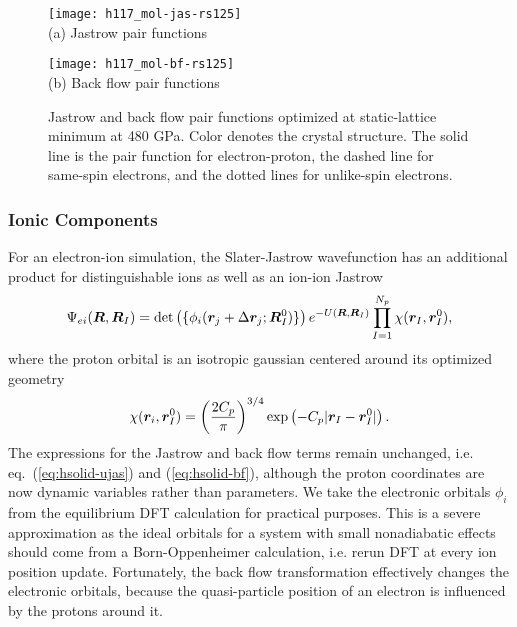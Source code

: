\begin{figure}[h]
\centering
\begin{minipage}{0.49\textwidth}
\centering
\texttt{[image: h117\_mol-jas-rs125]}\\
(a) Jastrow pair functions
\end{minipage}
\begin{minipage}{0.49\textwidth}
\centering
\texttt{[image: h117\_mol-bf-rs125]}\\
(b) Back flow pair functions
\end{minipage}
\caption{Jastrow and back flow pair functions optimized at static-lattice minimum at 480 GPa. Color denotes the crystal structure. The solid line is the pair function for electron-proton, the dashed line for same-spin electrons, and the dotted lines for unlike-spin electrons.}
\label{fig:hsolid-static-jas-bf}
\end{figure}

\subsubsection{Ionic Components}
For an electron-ion simulation, the Slater-Jastrow wavefunction has an additional product for distinguishable ions as well as an ion-ion Jastrow
\begin{align}
\Psi_{ei}(\boldsymbol{R}, \boldsymbol{R}_I) = \det\left( \{ \phi_i(\boldsymbol{r}_j+\Delta\boldsymbol{r}_j; \boldsymbol{R}_I^0)\} \right) e^{-U(\boldsymbol{R},\boldsymbol{R}_I)} \prod\limits_{I=1}^{N_p} \chi(\boldsymbol{r}_I, \boldsymbol{r}_I^0),
\end{align}
where the proton orbital is an isotropic gaussian centered around its optimized geometry
\begin{align}
\chi(\boldsymbol{r}_i, \boldsymbol{r}_I^0) = \left(\dfrac{2C_p}{\pi}\right)^{3/4} \exp\left(
-C_p\vert\boldsymbol{r}_I-\boldsymbol{r}_I^0\vert
\right).
\end{align}
The expressions for the Jastrow and back flow terms remain unchanged, i.e. eq.~(\ref{eq:hsolid-ujas}) and (\ref{eq:hsolid-bf}), although the proton coordinates are now dynamic variables rather than parameters.
We take the electronic orbitals $\phi_i$ from the equilibrium DFT calculation for practical purposes.
This is a severe approximation as the ideal orbitals for a system with small nonadiabatic effects should come from a Born-Oppenheimer calculation, i.e. rerun DFT at every ion position update.
Fortunately, the back flow transformation effectively changes the electronic orbitals, because the quasi-particle position of an electron is influenced by the protons around it.


